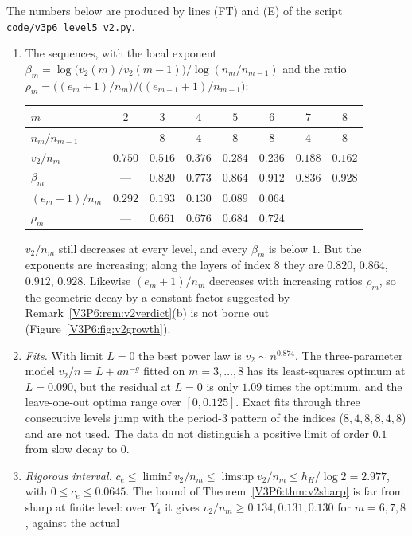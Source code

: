 \begin{remark}\label{V3P6:rem:v2eight}
The numbers below are produced by lines (FT) and (E) of the script
\texttt{code/v3p6\_level5\_v2.py}.
\begin{enumerate}
\item[(a)] The sequences, with the local exponent
$\beta_m=\log\bigl(v_2(m)/v_2(m-1)\bigr)/\log(n_m/n_{m-1})$ and the ratio
$\rho_m=\bigl((e_m+1)/n_m\bigr)/\bigl((e_{m-1}+1)/n_{m-1}\bigr)$:
\begin{center}\small
\begin{tabular}{lccccccc}
\toprule
$m$ & $2$ & $3$ & $4$ & $5$ & $6$ & $7$ & $8$\\
\midrule
$n_m/n_{m-1}$ & --- & $8$ & $4$ & $8$ & $8$ & $4$ & $8$\\
$v_2/n_m$ & $0.750$ & $0.516$ & $0.376$ & $0.284$ & $0.236$ & $0.188$ & $0.162$\\
$\beta_m$ & --- & $0.820$ & $0.773$ & $0.864$ & $0.912$ & $0.836$ & $0.928$\\
$(e_m+1)/n_m$ & $0.292$ & $0.193$ & $0.130$ & $0.089$ & $0.064$ & & \\
$\rho_m$ & --- & $0.661$ & $0.676$ & $0.684$ & $0.724$ & & \\
\bottomrule
\end{tabular}
\end{center}
$v_2/n_m$ still decreases at every level, and every $\beta_m$ is below $1$. But the exponents are
increasing; along the layers of index $8$ they are $0.820$, $0.864$, $0.912$, $0.928$. Likewise
$(e_m+1)/n_m$ decreases with increasing ratios $\rho_m$, so the geometric decay by a constant factor
suggested by Remark~\ref{V3P6:rem:v2verdict}(b) is not borne out (Figure~\ref{V3P6:fig:v2growth}).
\item[(b)] \emph{Fits.} With limit $L=0$ the best power law is $v_2\sim n^{0.874}$. The
three-parameter model $v_2/n=L+an^{-g}$ fitted on $m=3,\dots,8$ has its least-squares optimum at
$L=0.090$, but the residual at $L=0$ is only $1.09$ times the optimum, and the leave-one-out optima
range over $[0,0.125]$. Exact fits through three consecutive levels jump with the period-$3$
pattern of the indices ($8,4,8,8,4,8$) and are not used. The data do not distinguish a positive
limit of order $0.1$ from slow decay to $0$.
\item[(c)] \emph{Rigorous interval.} $c_e\le\liminf v_2/n_m\le\limsup v_2/n_m\le h_H/\log2=2.977$,
with $0\le c_e\le0.0645$. The bound of Theorem~\ref{V3P6:thm:v2sharp} is far from sharp at finite
level: over $Y_4$ it gives $v_2/n_m\ge0.134,0.131,0.130$ for $m=6,7,8$, against the actual

\end{enumerate}
\end{remark}
